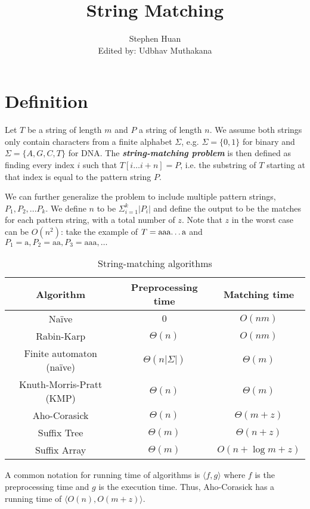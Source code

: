 \documentclass[11pt, oneside]{article}
\title{String Matching}
\author{Stephen Huan \\ Edited by: Udbhav Muthakana}
\newcommand{\emphasis}[1]{\textbf{\textit{#1}}}
\begin{document}
\maketitle

\section{Definition}
Let \( T \) be a string of length \( m \) and \( P \) a string of length \( n \).
We assume both strings only contain characters from a finite alphabet \( \Sigma \),
e.g. \( \Sigma = \{ 0, 1 \} \) for binary and \( \Sigma = \{ A, G, C, T \} \) for DNA.
The \emphasis{string-matching problem} is then defined as finding every index \( i \)
such that \( T[i \dots i + n] = P \), i.e. the substring of \( T \) starting at that index is
equal to the pattern string \( P \).

We can further generalize the problem to include multiple pattern strings, \( P_1, P_2, ... P_k \). We define \( n \) to be \( \Sigma^{k}_{i = 1} |P_i| \) and define the output to be the matches for each pattern string, with a total number of \( z \). Note that \( z \) in the worst case can be
\( O(n^2) \): take the example of \( T = \text{aaa\dots a} \) and \( P_1 = \text{a}, P_2 = \text{aa}, P_3 = \text{aaa}, \dots \)

\begin{table}[h!]
\centering
\begin{tabular}{ ccc }
 Algorithm & Preprocessing time & Matching time \\
 \hline
 Naïve & \( 0 \) & \( O(nm) \) \\
 Rabin-Karp & \( \Theta(n) \) & \( O(nm) \) \\
 Finite automaton (naïve) & \( \Theta(n|\Sigma|) \) & \( \Theta(m) \) \\
 Knuth-Morris-Pratt (KMP) & \( \Theta(n) \) & \( \Theta(m) \) \\
 Aho-Corasick & \( \Theta(n) \) & \( \Theta(m + z) \) \\
 Suffix Tree & \( \Theta(m) \) & \( \Theta(n + z) \) \\
 Suffix Array & \( \Theta(m) \) & \( O(n + \log m + z) \) \\
 \hline
\end{tabular}
\caption{String-matching algorithms}
\end{table}

A common notation for running time of algorithms is \( \langle f, g \rangle \)
where \( f \) is the preprocessing time and \( g \) is the execution time. Thus, Aho-Corasick has a running time of \( \langle O(n), O(m + z) \rangle \).
\end{document}
